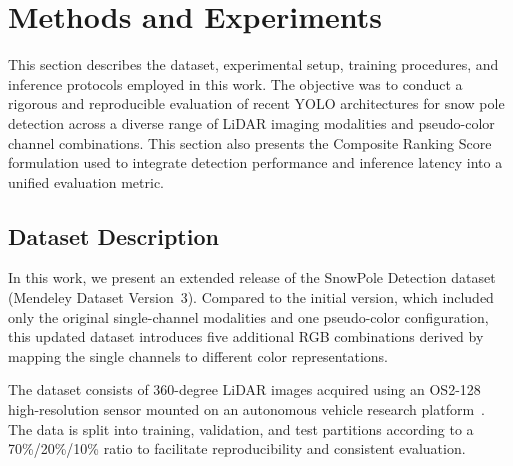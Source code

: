 \documentclass[runningheads]{llncs}
\begin{document}
\section{Methods and Experiments}

This section describes the dataset, experimental setup, training procedures, and inference protocols employed in this work. The objective was to conduct a rigorous and reproducible evaluation of recent YOLO architectures for snow pole detection across a diverse range of LiDAR imaging modalities and pseudo-color channel combinations. This section also presents the Composite Ranking Score formulation used to integrate detection performance and inference latency into a unified evaluation metric.

\subsection{Dataset Description}

In this work, we present an extended release of the SnowPole Detection dataset~\cite{bavirisetti2025extended} (Mendeley Dataset Version~3). Compared to the initial version, which included only the original single-channel modalities and one pseudo-color configuration, this updated dataset introduces five additional RGB combinations derived by mapping the single channels to different color representations. 

The dataset consists of 360-degree LiDAR images acquired using an OS2-128 high-resolution sensor mounted on an autonomous vehicle research platform~\cite{bavirisetti2025snowpole}. The data is split into training, validation, and test partitions according to a 70\%/20\%/10\% ratio to facilitate reproducibility and consistent evaluation. 
\end{document}
